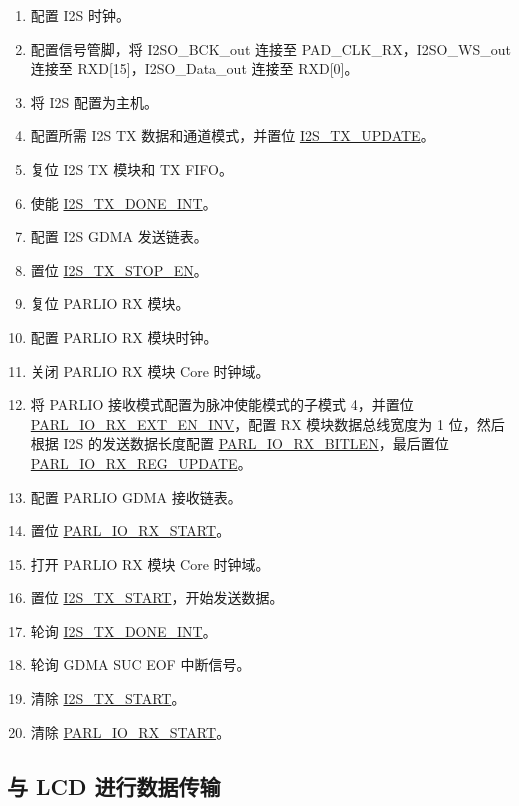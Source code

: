 \documentclass[main\_\_CN.tex]{subfiles}
\begin{document}
\begin{enumerate}
    \item 配置 I2S 时钟。
    \item 配置信号管脚，将 I2SO\_BCK\_out 连接至 PAD\_CLK\_RX，I2SO\_WS\_out 连接至 RXD[15]，I2SO\_Data\_out 连接至 RXD[0]。
    \item 将 I2S 配置为主机。
    \item 配置所需 I2S TX 数据和通道模式，并置位 \hyperref[fielddesc:I2STXUPDATE]{I2S\_TX\_UPDATE}。
    \item 复位 I2S TX 模块和 TX FIFO。
    \item 使能 \hyperref[int:I2STXDONEINT]{I2S\_TX\_DONE\_INT}。
    \item 配置 I2S GDMA 发送链表。
    \item 置位 \hyperref[fielddesc:I2STXSTOPEN]{I2S\_TX\_STOP\_EN}。
    \item 复位 PARLIO RX 模块。
    \item 配置 PARLIO RX 模块时钟。
    \item 关闭 PARLIO RX 模块 Core 时钟域。
    \item 将 PARLIO 接收模式配置为脉冲使能模式的子模式 4，并置位 \hyperref[fielddesc:PARLIORXEXTENINV]{PARL\_IO\_RX\_EXT\_EN\_INV}，配置 RX 模块数据总线宽度为 1 位，然后根据 I2S 的发送数据长度配置 \hyperref[fielddesc:PARLIORXBITLEN]{PARL\_IO\_RX\_BITLEN}，最后置位 \hyperref[fielddesc:PARLIORXREGUPDATE]{PARL\_IO\_RX\_REG\_UPDATE}。
    \item 配置 PARLIO GDMA 接收链表。
    \item 置位 \hyperref[fielddesc:PARLIORXSTART]{PARL\_IO\_RX\_START}。
    \item 打开 PARLIO RX 模块 Core 时钟域。
    \item 置位 \hyperref[fielddesc:I2STXSTART]{I2S\_TX\_START}，开始发送数据。
    \item 轮询 \hyperref[int:I2STXDONEINT]{I2S\_TX\_DONE\_INT}。
    \item 轮询 GDMA SUC EOF 中断信号。
    \item 清除 \hyperref[fielddesc:I2STXSTART]{I2S\_TX\_START}。
    \item 清除 \hyperref[fielddesc:PARLIORXSTART]{PARL\_IO\_RX\_START}。
\end{enumerate}


\subsection{与 LCD 进行数据传输}
\end{document}
